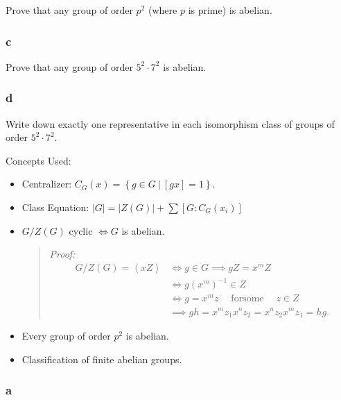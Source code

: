 Prove that any group of order \(p^2\) (where \(p\) is prime) is abelian.

\hypertarget{c-13}{%
\subsubsection{c}\label{c-13}}

Prove that any group of order \(5^2 \cdot 7^2\) is abelian.

\hypertarget{d-5}{%
\subsubsection{d}\label{d-5}}

Write down exactly one representative in each isomorphism class of
groups of order \(5^2 \cdot 7^2\).

\begin{solution}

Concepts Used:

\begin{itemize}
\item
  Centralizer:
  \(C_G(x) = \left\{{g\in G {~\mathrel{\Big|}~}[gx] = 1}\right\}\).
\item
  Class Equation:
  \({\left\lvert {G} \right\rvert} = {\left\lvert {Z(G)} \right\rvert} + \sum [G: C_G(x_i)]\)
\item
  \(G/Z(G)\) cyclic \(\iff G\) is abelian.

  \begin{quote}
  \emph{Proof:}
  \begin{align*}
  G/Z(G) = \left\langle{xZ}\right\rangle 
  &\iff g\in G \implies gZ = x^mZ \\
  &\iff g(x^m)^{-1}\in Z \\
  &\iff g = x^m z {\quad \operatorname{for some} \quad}z\in Z\\
  &\implies gh = x^mz_1 x^n z_2 = x^n z_2 x^m z_1 = hg
  .\end{align*}
  \end{quote}
\item
  Every group of order \(p^2\) is abelian.
\item
  Classification of finite abelian groups.
\end{itemize}

\hypertarget{a-24}{%
\subsubsection{a}\label{a-24}}


\end{solution}
